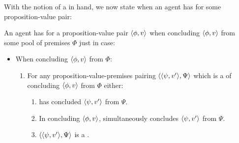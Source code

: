 \begin{note}
  With the notion of a \requ{} in hand, we now state when an agent has  for some proposition-value pair:

  \begin{idea}[\izetaS{}]
    \label{idea:zetaS}
    An agent \vAgent{} has \emph{\zetaS{}} for a proposition-value pair \(\langle \phi, v \rangle\) when concluding \(\langle \phi, v \rangle\) from some pool of premises \(\Phi\) just in case:
    \begin{itemize}
    \item When concluding \(\langle \phi, v \rangle\) from \(\Phi\):
      \begin{enumerate}[label=\arabic*., ref=\named{CS:\arabic*}]
      \item
        \label{idea:zetaS::requ}
        For any proposition-value-premises pairing \(\langle \langle \psi, v' \rangle, \Psi \rangle\) which is a \requ{} of concluding \(\langle \phi, v \rangle\) from \(\Phi\) either:
        \begin{enumerate}[label=\alph*., ref=\named{CS:1.\alph*}]
        \item
          \label{idea:zetaS::requ-sat:Past}
          \vAgent{} has concluded \(\langle \psi, v' \rangle\) from \(\Psi\).
        \item
          \label{idea:zetaS::requ-sat:Pres}
          In concluding \(\langle \phi, v \rangle\), \vAgent{} simultaneously concludes \(\langle \psi, v' \rangle\) from \(\Psi\).
        \item
          \label{idea:zetaS::requ-sat:Forgone}
          \(\langle \langle \psi, v' \rangle, \Psi \rangle\) is a .
        \end{enumerate}
      \end{enumerate}
    \end{itemize}
    \vspace{-\baselineskip}
  \end{idea}
\end{note}

